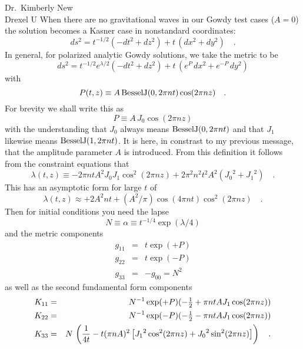 \begin{letter}{%
Dr.\ Kimberly New\\
Drexel U
}
    When there are no gravitational waves in our Gowdy test cases
($A=0$) the solution becomes a Kasner case in nonstandard
coordinates:
    \begin{equation}\label{eq-Kasner}
        ds^2 = t^{-1/2} (- dt^2 + dz^2) + t\,(dx^2 + dy^2)
        \quad .
    \end{equation}
    In general, for polarized analytic Gowdy solutions, we take the
metric to be
        \begin{equation}\label{eq-gdyt}
    ds^2 = t^{-1/2} e^{\lambda/2}(- dt^2 + dz^2)
           +t\, ( e^P\,dx^2 + e^{-P}\,dy^2 )
    \end{equation}
    with 
    \begin{equation} P(t,z) \equiv A\, 
    {\rm BesselJ}(0, 2 \pi n t)\cos(2 \pi n z)
    \quad .
    \end{equation}
    For brevity we shall write this as
    \begin{equation}\label{eq-P}
    P \equiv A\,J_0 \cos(2\pi n z)
    \end{equation}
    with the understanding that $J_0$ always means ${\rm BesselJ}(0,
2 \pi n t)$ and that $J_1$ likewise means ${\rm BesselJ}(1, 2 \pi n
t)$.  
    It is here, in constrast to my previous message, that the
amplitude parameter $A$ is introduced.
    From this definition it follows from the constraint equations
that
    \begin{equation}\label{eq-L}
    \lambda(t,z) \equiv  - 2 \pi n t A^2 J_0 J_1 \cos^2 (2 \pi n z)
    + 2 \pi^2 n^2 t^2 A^2 
    \left( {J_0}^{2} + {J_1}^2 \right)
    \quad .
    \end{equation}
    This has an asymptotic form for large $t$ of
    \begin{equation}\label{eq-Linf}
    \lambda(t,z) \approx  + 2 A^2 n t 
                          + (A^2/\pi) \cos(4\pi n t) \cos^2(2\pi n z)
    \quad .
    \end{equation}
    Then for initial conditions you need the lapse
    \begin{equation}\label{eq-N}
    N \equiv \alpha \equiv t^{-1/4}\exp{(\lambda/4)}
    \end{equation}
    and the metric components
    \begin{eqnarray}
    g_{11} & = & t \exp{(+P)}\\
    g_{22} & = & t \exp{(-P)}\\
    g_{33} & = & - g_{00} = N^2
    \end{eqnarray}
    as well as the second fundamental form components
    \begin{eqnarray}
    K_{11} & = & N^{-1}\exp(+P)  (-\mbox{$\frac{1}{2}$} + \pi n t A J_1 
                    \cos(2 \pi n z) )\\
    K_{22} & = & N^{-1}\exp(-P) (-\mbox{$\frac{1}{2}$} - \pi n t A J_1 
                    \cos(2 \pi n z) )\\
    K_{33} & = & N\,\left(\frac{1}{4 t} -
               t (\pi n A)^2 
                      \left[ {J_1}^2\cos^2(2 \pi n z)
                           + {J_0}^2\sin^2(2 \pi n z) \right] \right)
                      \quad .
    \end{eqnarray}


\end{letter}
